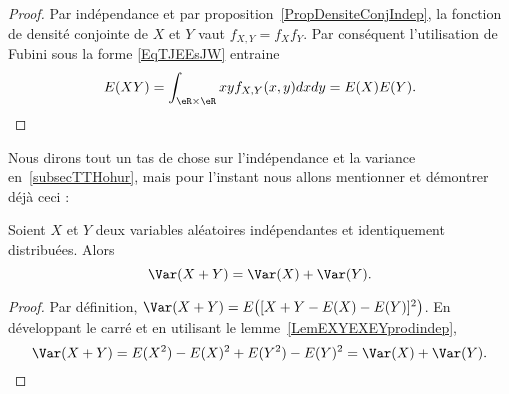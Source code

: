 \begin{proof}
	Par indépendance et par proposition~\ref{PropDensiteConjIndep}, la fonction de densité conjointe de \( X\) et \( Y\) vaut \( f_{X,Y}=f_Xf_Y\). Par conséquent l'utilisation de Fubini sous la forme \eqref{EqTJEEsJW} entraine
	\begin{equation}
		E(XY)=\int_{\eR\times\eR}xyf_{X,Y}(x,y)dxdy=E(X)E(Y).
	\end{equation}
\end{proof}

Nous dirons tout un tas de chose sur l'indépendance et la variance en~\ref{subsecTTHohur}, mais pour l'instant nous allons mentionner et démontrer déjà ceci :
\begin{lemma}   \label{LemVarXpYsmindep}
	Soient \( X\) et \( Y\) deux variables aléatoires indépendantes et identiquement distribuées. Alors
	\begin{equation}
		\Var(X+Y)=\Var(X)+\Var(Y).
	\end{equation}
\end{lemma}

\begin{proof}
	Par définition, \( \Var(X+Y)=E\big( [X+Y-E(X)-E(Y)]^2 \big)\). En développant le carré et en utilisant le lemme~\ref{LemEXYEXEYprodindep},
	\begin{equation}
		\Var(X+Y)=E(X^2)-E(X)^2+E(Y^2)-E(Y)^2=\Var(X)+\Var(Y).
	\end{equation}
\end{proof}

